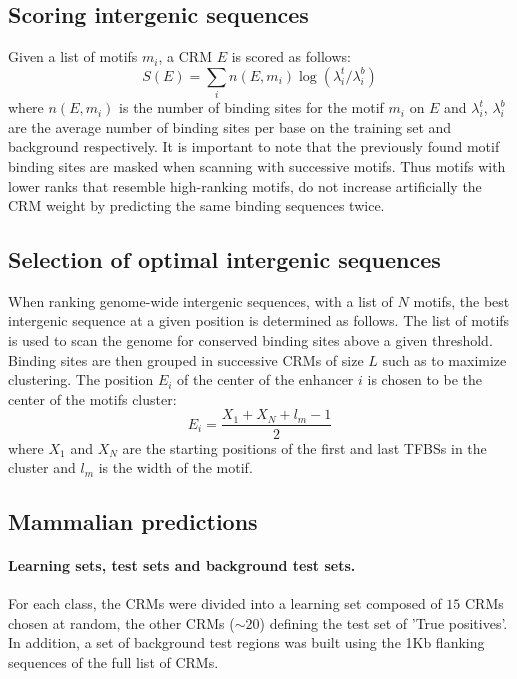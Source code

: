 \documentclass[a4,center,fleqn]{NAR}
\begin{document}
\subsection{Scoring intergenic sequences}
Given a list of motifs $m_i$, a CRM $E$ is scored  as follows:
\begin{equation}
    S(E)=\sum_{i} n(E,m_i) \log(\lambda_i^t/\lambda_i^b)
    \label{score_enh}
\end{equation}
where $n(E,m_i)$ is the number of binding sites for the motif $m_i$ on $E$ and
$\lambda_i^t$, $\lambda_i^b$ are the average number of binding sites per base
on the training set and background respectively.
It is important to note that the previously found motif binding sites are
masked when scanning with successive motifs.
Thus motifs with lower ranks that resemble  high-ranking motifs, do not
increase artificially the CRM weight by predicting the same binding sequences
twice. 

\subsection*{Selection of optimal intergenic sequences}
When ranking genome-wide intergenic sequences, with a list of $N$ motifs,
the best intergenic sequence at a given position is determined as follows.
The list of motifs is used to scan the genome for conserved binding sites
above a given threshold. Binding sites are then  grouped in
successive CRMs of size $L$ such as to maximize clustering.
The position $E_i$ of the center of the enhancer $i$ is chosen to be the center
of the motifs cluster:
\begin{equation}
E_i = \frac{X_1+X_N+l_m-1}{2} 
\end{equation} 
where $X_1$ and $X_N$ are the starting positions of the first and last TFBSs in
the cluster and $l_m$ is the width of the motif.

\subsection*{Mammalian predictions}
\paragraph{Learning sets, test sets and background  test sets.}

For each class, the CRMs were divided into a learning set composed of $15$ CRMs
chosen at random, the other CRMs ($\sim 20$) defining the test set of 'True
positives'.
In addition, a set of background test regions was built using the 1Kb flanking
sequences of the full list of CRMs.
\end{document}

